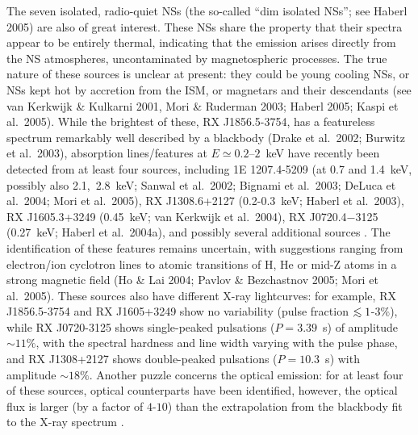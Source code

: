 \documentclass[useAMS,onecolumn,usenatbib,usegraphicx]{mn2e}
\def\lo{\mathrel{\raise.3ex\hbox{$<$}\mkern-14mu\lower0.6ex\hbox{$\sim$}}}
\begin{document}
The seven isolated, radio-quiet NSs
(the so-called ``dim isolated NSs''; see Haberl 2005) are also 
of great interest.  These NSs share
the property that their spectra appear to be entirely thermal,
indicating that the emission arises directly from the NS atmospheres,
uncontaminated by magnetospheric processes.  
The true nature of these sources is unclear at present: they could be
young cooling NSs, or NSs kept hot by accretion from the ISM, or
magnetars and their descendants (see van Kerkwijk \& Kulkarni 2001,
Mori \& Ruderman 2003; Haberl 2005; Kaspi et al.~2005). 
While the brightest of these, RX J1856.5-3754, has a featureless
spectrum remarkably well described by a blackbody (Drake et al.~2002;
Burwitz et al.~2003), absorption lines/features at $E\simeq
0.2$--$2$~keV have recently been detected from at least four sources,
including 1E 1207.4-5209 (at 0.7 and 1.4~keV, possibly also 2.1,~2.8~keV;
%
%
Sanwal et al.~2002; Bignami et al.~2003; DeLuca et al.~2004; Mori et al.~2005), 
RX J1308.6+2127 (0.2-0.3~keV; Haberl et al.~2003), RX J1605.3+3249
(0.45~keV; van Kerkwijk et al.~2004), RX J0720.4$-$3125 (0.27~keV;
Haberl et al.~2004a), and possibly several additional sources 
\citep[see][]{Haberletal04b,Zaneetal05a}.
The identification of these features remains
uncertain, with suggestions ranging from electron/ion cyclotron lines
to atomic transitions of H, He or mid-Z atoms in a strong magnetic
field (Ho \& Lai 2004; Pavlov \& Bezchastnov 2005; Mori et al.~2005).
These sources also have different X-ray lightcurves: for example, RX
J1856.5-3754 and RX J1605+3249 show no variability (pulse fraction
$\lo 1$-$3\%$), while RX J0720-3125 shows single-peaked 
pulsations ($P=3.39$~s) of amplitude $\sim 11\%$, with the spectral hardness 
and line width varying with the pulse phase, and RX J1308+2127 shows 
double-peaked pulsations ($P=10.3$~s) with amplitude $\sim 18\%$.
Another puzzle concerns the optical emission: for at least four of these
sources, optical counterparts have been identified, however, the
optical flux is larger (by a factor of $4$-$10$) than the
extrapolation from the blackbody fit to the X-ray spectrum 
%
%
\citep[see, e.g.,][]{Trumperetal04a,Haberl05a}.
\end{document}
